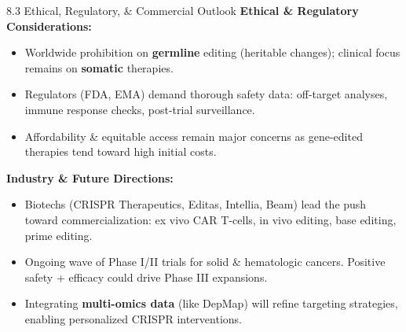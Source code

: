 \documentclass[10pt]{beamer}
\begin{document}
\begin{frame}{8.3 Ethical, Regulatory, \& Commercial Outlook}
  \textbf{Ethical \& Regulatory Considerations:}
  \begin{itemize}
    \item Worldwide prohibition on \textbf{germline} editing (heritable changes);
          clinical focus remains on \textbf{somatic} therapies.
    \item Regulators (FDA, EMA) demand thorough safety data:
          off-target analyses, immune response checks, post-trial surveillance.
    \item Affordability \& equitable access remain major concerns as gene-edited therapies
          tend toward high initial costs.
  \end{itemize}

  \vspace{0.3em}
  \textbf{Industry \& Future Directions:}
  \begin{itemize}
    \item Biotechs (CRISPR Therapeutics, Editas, Intellia, Beam) lead the push toward commercialization:
          ex vivo CAR T-cells, in vivo editing, base editing, prime editing.
    \item Ongoing wave of Phase I/II trials for solid \& hematologic cancers.
          Positive safety + efficacy could drive Phase III expansions.
    \item Integrating \textbf{multi-omics data} (like DepMap) will refine targeting strategies,
          enabling personalized CRISPR interventions.
  \end{itemize}
\end{frame}
\end{document}
